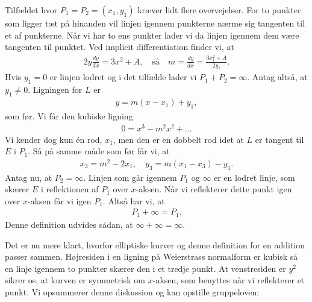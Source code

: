 Tilfældet hvor $P_1 = P_2 = (x_1, y_1)$ kræver lidt flere overvejelser. For to punkter som ligger
tæt på hinanden vil linjen igennem punkterne nærme sig tangenten til et af punkterne. Når vi har to ens punkter lader vi da linjen igennem dem være tangenten til punktet. Ved implicit differentiation finder vi, at 
\begin{align*}
	2y \frac{dy}{dx} = 3x^2 + A, \quad \text{så} \quad m = \frac{dy}{dx} = \frac{3x_{1}^{2} + A}{2y_1}.
\end{align*}
Hvis $y_1 = 0$ er linjen lodret og i det tilfælde lader vi $P_1 + P_2 = \infty$. Antag altså, at $y_1 \neq 0$. Ligningen for $L$ er 
\begin{align*}
	y = m(x-x_1) + y_1,
\end{align*}
som før. Vi får den kubiske ligning
\begin{align*}
	0 = x^3 - m^2 x^2 + \ldots
\end{align*}
Vi kender dog kun én rod, $x_1$, men den er en dobbelt rod idet at $L$ er tangent til $E$ i $P_1$. Så på samme måde som før får vi, at 
\begin{align*}
	x_3 = m^2 - 2x_1, \quad y_3 = m(x_1 - x_3) - y_1.
\end{align*}
Antag nu, at $P_2 = \infty$. Linjen som går igennem $P_1$ og $\infty$ er en lodret linje, som skærer $E$ i reflektionen af $P_1$ over $x$-aksen. Når vi reflekterer dette punkt igen over $x$-aksen får vi igen $P_1$. Altså har vi, at
\begin{align*}
	P_1 + \infty = P_1.
\end{align*}
Denne definition udvides sådan, at $\infty + \infty = \infty$.

Det er nu mere klart, hvorfor elliptiske kurver og denne definition for en addition passer sammen. Højresiden i en ligning på Weierstrass normalform er kubisk så en linje igennem to punkter skærer den i et tredje punkt. At venstresiden er $y^2$ sikrer os, at kurven er symmetrisk om $x$-aksen, som benyttes når vi reflekterer et punkt. Vi opsummerer denne diskussion og kan opstille gruppeloven:

